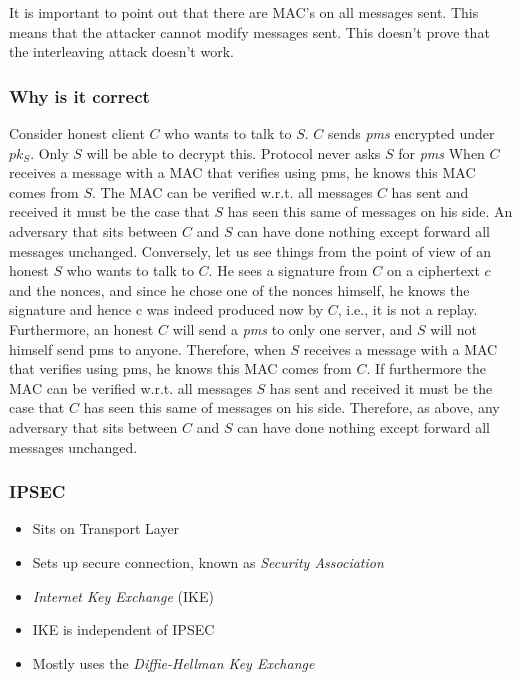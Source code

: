 \documentclass[14pt]{beamer}
\begin{document}
            \begin{frame}
                It is important to point out that there are MAC's on all messages sent. This means that the attacker cannot modify messages sent. This doesn't prove that the interleaving attack doesn't work. 
            \end{frame}

            \begin{frame}
                \frametitle{Why is it correct}
                    Consider honest client $C$ who wants to talk to $S$. $C$ sends \textit{pms} encrypted under $pk_S$.
                    Only $S$ will be able to decrypt this. 
                    Protocol never asks $S$ for \textit{pms} 
                    When $C$ receives a message with a MAC that verifies using pms, he knows this MAC comes from $S$. 
                    The MAC can be verified w.r.t. all messages $C$ has sent and received it must be the case that $S$ has seen this same of messages on his side. 
                    An adversary that sits between $C$ and $S$ can have done nothing except forward all messages unchanged. 
                    Conversely, let us see things from the point of view of an honest $S$ who wants to talk to $C$. He sees a signature from $C$ on a ciphertext $c$ and the nonces, and since he chose one of the nonces himself, he knows the signature and hence c was indeed produced now by $C$, i.e., it is not a replay. Furthermore, an honest $C$ will send a \textit{pms} to only one server, and $S$ will not himself send pms to anyone. Therefore, when $S$ receives a message with a MAC that verifies using pms, he knows this MAC comes from $C$. If furthermore the MAC can be verified w.r.t. all messages $S$ has sent and received it must be the case that $C$ has seen this same of messages on his side. Therefore, as above, any adversary that sits between $C$ and $S$ can have done nothing except forward all messages unchanged.
            \end{frame}

    \begin{frame}
        \frametitle{IPSEC}
            \begin{itemize}
                \item Sits on Transport Layer
                \item Sets up secure connection, known as \textit{Security Association}
                \item \textit{Internet Key Exchange} (IKE)
                \item IKE is independent of IPSEC
                \item Mostly uses the \textit{Diffie-Hellman Key Exchange}
            \end{itemize}
    \end{frame}
\end{document}
